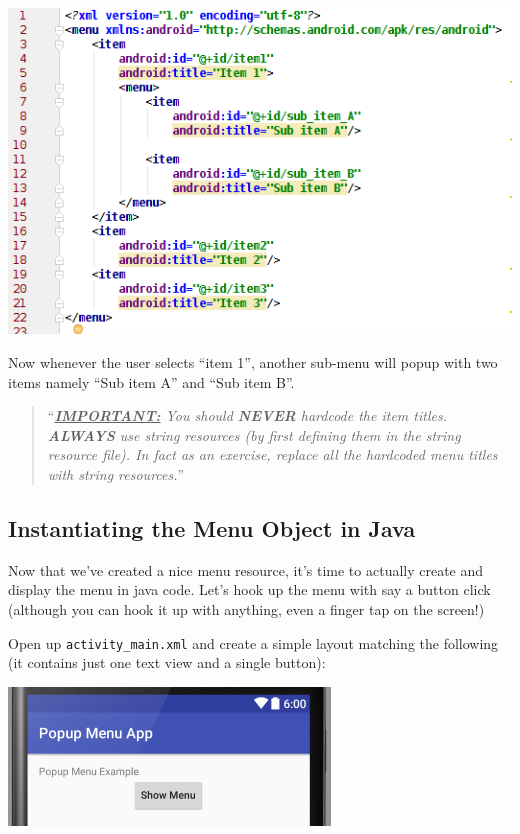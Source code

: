 \begin{center}
	\includegraphics[scale=0.4]{chapters/ch07/images/40}
\end{center}

Now whenever the user selects ``item 1'', another sub-menu will popup with two items namely ``Sub item A'' and ``Sub item B''.

\begin{quote}
	``\textit{\underline{\textbf{IMPORTANT:}} You should \textbf{NEVER} hardcode the item titles. \textbf{ALWAYS} use string resources (by first defining them in the string resource file). In fact as an exercise, replace all the hardcoded menu titles with string resources.}''
\end{quote}

\subsection{Instantiating the Menu Object in Java}
Now that we've created a nice menu resource, it's time to actually create and display the menu in java code. Let's hook up the menu with say a button click (although you can hook it up with anything, even a finger tap on the screen!)

Open up \texttt{activity\_main.xml} and create a simple layout matching the following (it contains just one text view and a single button):

\begin{center}
	\includegraphics[scale=0.4]{chapters/ch07/images/41}
\end{center}

